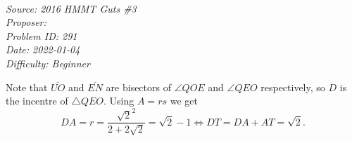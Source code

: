 \SSbreak\\
\emph{Source: 2016 HMMT Guts \#3}\\
\emph{Proposer: \Paiya}\\ %
\emph{Problem ID: 291}\\
\emph{Date: 2022-01-04}\\
\emph{Difficulty: Beginner}\\
\SSbreak

\bigskip

\begin{solution}\hfil\medskip
  
    Note that $\overline{UO}$ and $\overline{EN}$ are bisectors of $\angle QOE$ and $\angle QEO$ 
    respectively, so $D$ is the incentre of $\triangle QEO$. Using $A = rs$ we get 
    $$DA = r = \dfrac{\sqrt{2}^2}{2 + 2\sqrt{2}} = \sqrt{2} - 1 \iff DT = DA + AT = \boxed{\sqrt{2}}.$$
\end{solution}\bigskip
